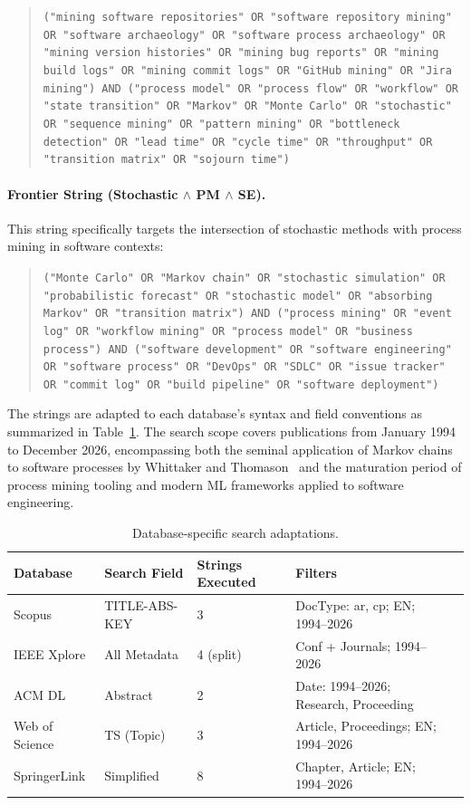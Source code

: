 \begin{quote}
\small
\texttt{("mining software repositories" OR "software repository mining" OR "software archaeology" OR "software process archaeology" OR "mining version histories" OR "mining bug reports" OR "mining build logs" OR "mining commit logs" OR "GitHub mining" OR "Jira mining") AND ("process model" OR "process flow" OR "workflow" OR "state transition" OR "Markov" OR "Monte Carlo" OR "stochastic" OR "sequence mining" OR "pattern mining" OR "bottleneck detection" OR "lead time" OR "cycle time" OR "throughput" OR "transition matrix" OR "sojourn time")}
\end{quote}

\paragraph{Frontier String (Stochastic $\wedge$ PM $\wedge$ SE).} This string specifically targets the intersection of stochastic methods with process mining in software contexts:

\begin{quote}
\small
\texttt{("Monte Carlo" OR "Markov chain" OR "stochastic simulation" OR "probabilistic forecast" OR "stochastic model" OR "absorbing Markov" OR "transition matrix") AND ("process mining" OR "event log" OR "workflow mining" OR "process model" OR "business process") AND ("software development" OR "software engineering" OR "software process" OR "DevOps" OR "SDLC" OR "issue tracker" OR "commit log" OR "build pipeline" OR "software deployment")}
\end{quote}

The strings are adapted to each database's syntax and field conventions as summarized in Table~\ref{tab:db-adaptations}. The search scope covers publications from January 1994 to December 2026, encompassing both the seminal application of Markov chains to software processes by Whittaker and Thomason~\cite{whittaker1994} and the maturation period of process mining tooling and modern ML frameworks applied to software engineering.

\begin{table}[htbp]
\centering
\caption{Database-specific search adaptations.}
\label{tab:db-adaptations}
\begin{tabular}{lllll}
\toprule
\textbf{Database} & \textbf{Search Field} & \textbf{Strings Executed} & \textbf{Filters} \\
\midrule
Scopus & TITLE-ABS-KEY & 3 & DocType: ar, cp; EN; 1994--2026 \\
IEEE Xplore & All Metadata & 4 (split) & Conf + Journals; 1994--2026 \\
ACM DL & Abstract & 2 & Date: 1994--2026; Research, Proceeding \\
Web of Science & TS (Topic) & 3 & Article, Proceedings; EN; 1994--2026 \\
SpringerLink & Simplified & 8 & Chapter, Article; EN; 1994--2026 \\
\bottomrule
\end{tabular}
\end{table}

